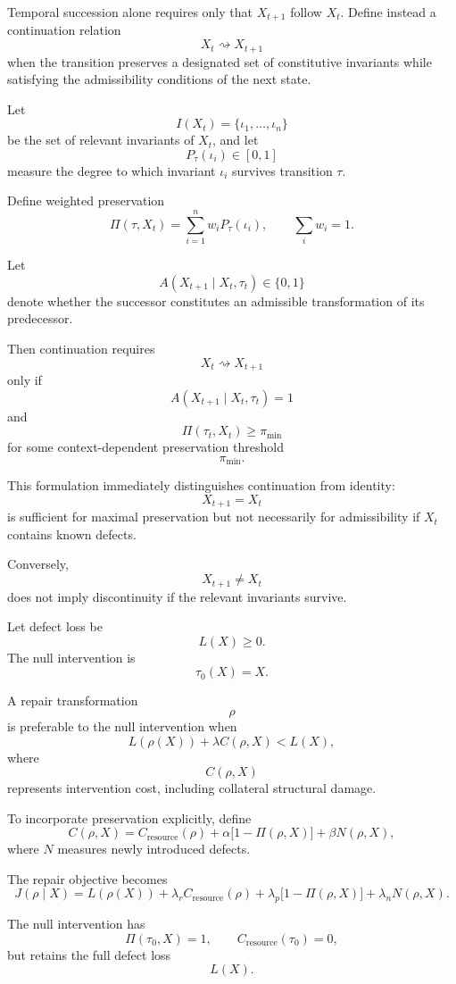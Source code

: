 \documentclass[11pt]{article}
\begin{document}
Temporal succession alone requires only that \(X_{t+1}\) follow \(X_t\). Define instead a continuation relation
\[
    X_t\rightsquigarrow X_{t+1}
\]
when the transition preserves a designated set of constitutive invariants while satisfying the admissibility conditions of the next state.

Let
\[
    I(X_t)
    =
    \{\iota_1,\ldots,\iota_n\}
\]
be the set of relevant invariants of \(X_t\), and let
\[
    P_\tau(\iota_i)
    \in[0,1]
\]
measure the degree to which invariant \(\iota_i\) survives transition \(\tau\).

Define weighted preservation
\[
    \Pi(\tau,X_t)
    =
    \sum_{i=1}^{n}
    w_iP_\tau(\iota_i),
    \qquad
    \sum_iw_i=1.
\]

Let
\[
    A(X_{t+1}\mid X_t,\tau_t)
    \in\{0,1\}
\]
denote whether the successor constitutes an admissible transformation of its predecessor.

Then continuation requires
\[
    X_t\rightsquigarrow X_{t+1}
\]
only if
\[
    A(X_{t+1}\mid X_t,\tau_t)=1
\]
and
\[
    \Pi(\tau_t,X_t)\geq\pi_{\min}
\]
for some context-dependent preservation threshold
\[
    \pi_{\min}.
\]

This formulation immediately distinguishes continuation from identity:
\[
    X_{t+1}=X_t
\]
is sufficient for maximal preservation but not necessarily for admissibility if \(X_t\) contains known defects.

Conversely,
\[
    X_{t+1}\neq X_t
\]
does not imply discontinuity if the relevant invariants survive.

Let defect loss be
\[
    L(X)\geq0.
\]
The null intervention is
\[
    \tau_0(X)=X.
\]

A repair transformation
\[
    \rho
\]
is preferable to the null intervention when
\[
    L(\rho(X))
    +
    \lambda C(\rho,X)
    <
    L(X),
\]
where
\[
    C(\rho,X)
\]
represents intervention cost, including collateral structural damage.

To incorporate preservation explicitly, define
\[
    C(\rho,X)
    =
    C_{\mathrm{resource}}(\rho)
    +
    \alpha
    \bigl[
        1-\Pi(\rho,X)
    \bigr]
    +
    \beta N(\rho,X),
\]
where \(N\) measures newly introduced defects.

The repair objective becomes
\[
    J(\rho\mid X)
    =
    L(\rho(X))
    +
    \lambda_r C_{\mathrm{resource}}(\rho)
    +
    \lambda_p
    \bigl[
        1-\Pi(\rho,X)
    \bigr]
    +
    \lambda_n N(\rho,X).
\]

The null intervention has
\[
    \Pi(\tau_0,X)=1,
\qquad
    C_{\mathrm{resource}}(\tau_0)=0,
\]
but retains the full defect loss
\[
    L(X).
\]
\end{document}
